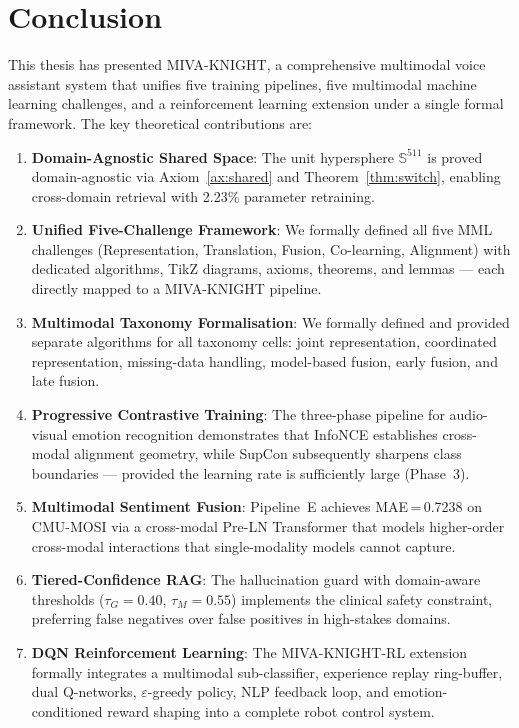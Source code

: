 \documentclass[12pt,a4paper]{article}
\theoremstyle{definition}
\theoremstyle{plain}
\theoremstyle{remark}
\newcommand{\Sph}{\mathbb{S}}
\begin{document}
\newpage
\section{Conclusion}
\label{sec:conclusion}

This thesis has presented MIVA-KNIGHT, a comprehensive multimodal voice assistant system that unifies five training pipelines, five multimodal machine learning challenges, and a reinforcement learning extension under a single formal framework. The key theoretical contributions are:

\begin{enumerate}
  \item \textbf{Domain-Agnostic Shared Space}: The unit hypersphere $\Sph^{511}$ is proved domain-agnostic via Axiom~\ref{ax:shared} and Theorem~\ref{thm:switch}, enabling cross-domain retrieval with 2.23\% parameter retraining.

  \item \textbf{Unified Five-Challenge Framework}: We formally defined all five MML challenges (Representation, Translation, Fusion, Co-learning, Alignment) with dedicated algorithms, TikZ diagrams, axioms, theorems, and lemmas --- each directly mapped to a MIVA-KNIGHT pipeline.

  \item \textbf{Multimodal Taxonomy Formalisation}: We formally defined and provided separate algorithms for all taxonomy cells: joint representation, coordinated representation, missing-data handling, model-based fusion, early fusion, and late fusion.

  \item \textbf{Progressive Contrastive Training}: The three-phase pipeline for audio-visual emotion recognition demonstrates that InfoNCE establishes cross-modal alignment geometry, while SupCon subsequently sharpens class boundaries --- provided the learning rate is sufficiently large (Phase~3).

  \item \textbf{Multimodal Sentiment Fusion}: Pipeline~E achieves MAE\,=\,0.7238 on CMU-MOSI via a cross-modal Pre-LN Transformer that models higher-order cross-modal interactions that single-modality models cannot capture.

  \item \textbf{Tiered-Confidence RAG}: The hallucination guard with domain-aware thresholds ($\tau_G = 0.40$, $\tau_M = 0.55$) implements the clinical safety constraint, preferring false negatives over false positives in high-stakes domains.

  \item \textbf{DQN Reinforcement Learning}: The MIVA-KNIGHT-RL extension formally integrates a multimodal sub-classifier, experience replay ring-buffer, dual Q-networks, $\varepsilon$-greedy policy, NLP feedback loop, and emotion-conditioned reward shaping into a complete robot control system.
\end{enumerate}
\end{document}
